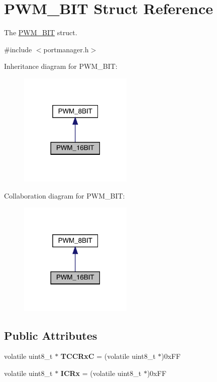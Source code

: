 \hypertarget{structPWM__16BIT}{}\section{P\+W\+M\+\_\+B\+IT Struct Reference}
\label{structPWM__16BIT}


The \hyperlink{structPWM__16BIT}{P\+W\+M\+\_\+B\+IT} struct.  




{\ttfamily \#include $<$portmanager.\+h$>$}



Inheritance diagram for P\+W\+M\+\_\+B\+IT\+:\nopagebreak
\begin{figure}[H]
\begin{center}
\leavevmode
\includegraphics[width=153pt]{structPWM__16BIT__inherit__graph}
\end{center}
\end{figure}


Collaboration diagram for P\+W\+M\+\_\+B\+IT\+:\nopagebreak
\begin{figure}[H]
\begin{center}
\leavevmode
\includegraphics[width=153pt]{structPWM__16BIT__coll__graph}
\end{center}
\end{figure}
\subsection*{Public Attributes}
\begin{DoxyCompactItemize}
\item 
\mbox{\label{structPWM__16BIT_aed58d52d5a361e85b19d584d9b59f1b9}} 
volatile uint8\+\_\+t $\ast$ {\bfseries T\+C\+C\+RxC} = (volatile uint8\+\_\+t $\ast$)0x\+FF
\item 
\mbox{\label{structPWM__16BIT_a6e5ea7c07d0fa0f6970bbfe9c2a11677}} 
volatile uint8\+\_\+t $\ast$ {\bfseries I\+C\+Rx} = (volatile uint8\+\_\+t $\ast$)0x\+FF
\end{DoxyCompactItemize}


